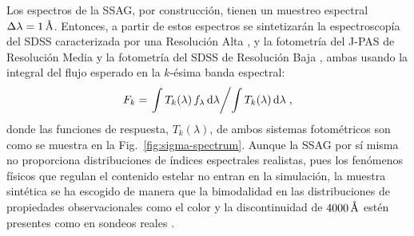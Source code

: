 Los espectros de la SSAG, por construcción, tienen un muestreo espectral
$\Delta\lambda=\unit[1]{\AA}$. Entonces, a partir de estos espectros se sintetizarán la
espectroscopía del SDSS caracterizada por una Resolución Alta \citep[RA:
$\Delta\lambda=1\,\text{\AA}$][]{Strauss2002}, y la fotometría del J-PAS de Resolución Media
\citep[RM: $\Delta\lambda=140\,\text{\AA}$][]{Marin-Franch2015} y la fotometría del SDSS de
Resolución Baja \citep[RB: $\Delta\lambda\sim1000\,{\AA}$][]{Doi2010}, ambas usando la integral del
flujo esperado en la $k$-ésima banda espectral:
%
\begin{equation}\label{ec:flujo-esperado}
F_k = \left.\int T_k(\lambda)\,f_\lambda\,\text{d}\lambda\middle/\int T_k(\lambda)\,\text{d}\lambda\right.,
\end{equation}
%
donde las funciones de respuesta, $T_k(\lambda)$, de ambos sistemas fotométricos son como se muestra
en la Fig.~\ref{fig:sigma-spectrum}. Aunque la SSAG por sí misma no proporciona distribuciones de
índices espectrales realistas, pues los fenómenos físicos que regulan el contenido estelar no entran
en la simulación, la muestra sintética se ha escogido de manera que la bimodalidad en las
distribuciones de propiedades observacionales como el color y la discontinuidad de
$\unit[4000]{\AA}$ estén presentes como en sondeos reales \citep{Strateva2001, Kauffmann2003,
Baldry2004}.

